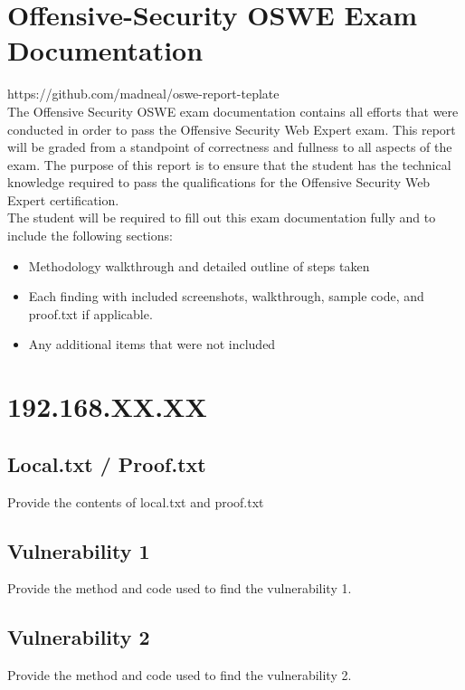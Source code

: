 \documentclass[a4paper]{article}
\begin{document}
\tableofcontents


\section{Offensive-Security OSWE Exam Documentation}

https://github.com/madneal/oswe-report-teplate
\\

The Offensive Security OSWE exam documentation contains all efforts that were conducted in order to pass the Offensive Security Web Expert exam. This report will be graded from a standpoint of correctness and fullness to all aspects of the exam. The purpose of this report is to ensure that the student has the technical knowledge required to pass the qualifications for the Offensive Security Web Expert certification.
\\
The student will be required to fill out this exam documentation fully and to include the following sections:

\begin{itemize}
  \item Methodology walkthrough and detailed outline of steps taken
  \item Each finding with included screenshots, walkthrough, sample code, and proof.txt if applicable.
  \item Any additional items that were not included
\end{itemize}

\section{192.168.XX.XX}

\subsection{Local.txt / Proof.txt }
Provide the contents of local.txt and proof.txt

\subsection{Vulnerability 1}
Provide the method and code used to find the vulnerability 1.

\subsection{Vulnerability 2}
Provide the method and code used to find the vulnerability 2.
\end{document}
